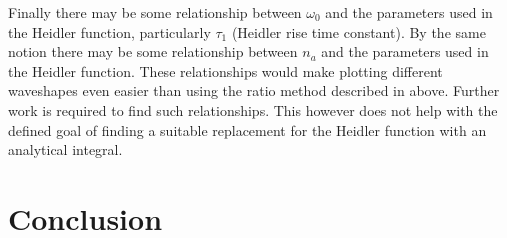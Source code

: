Finally there may be some relationship between $\omega_0$ and the parameters used in the Heidler function, particularly $\tau_1$ (Heidler rise time constant). By the same notion there may be some relationship between $n_a$ and the parameters used in the Heidler function. These relationships would make plotting different waveshapes even easier than using the ratio method described in  above. Further work is required to find such relationships. This however does not help with the defined goal of finding a suitable replacement for the Heidler function with an analytical integral.


\section{Conclusion}
\label{sec:discussion_conclusion}
